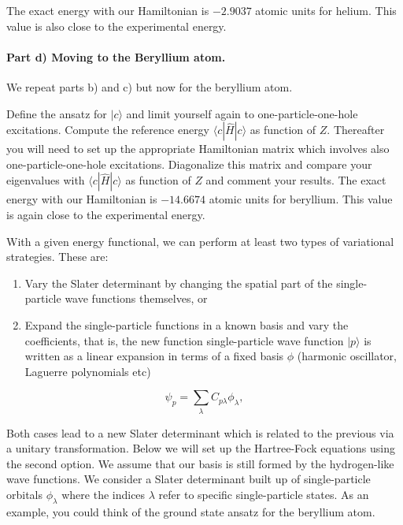 \documentclass[%
oneside,                 %
final,                   %
10pt]{article}
\begin{document}
The exact energy with our Hamiltonian is $-2.9037$ atomic units for
helium. This value is also close to the experimental energy.

\paragraph{Part d) Moving to the Beryllium atom.}
We repeat parts b) and c) but now for the beryllium atom.

Define the ansatz for $|c\rangle$ and limit yourself again to
one-particle-one-hole excitations.  Compute the reference energy
$\langle c | \hat{H}| c \rangle $ as function of $Z$. Thereafter you
will need to set up the appropriate Hamiltonian matrix which involves
also one-particle-one-hole excitations. Diagonalize this matrix and
compare your eigenvalues with $\langle c | \hat{H}| c \rangle$ as
function of $Z$ and comment your results.  The exact energy with our
Hamiltonian is $-14.6674$ atomic units for beryllium. This value is
again close to the experimental energy.

With a given energy
functional, we can perform at least two types of variational strategies. These are:

\begin{enumerate}
\item Vary the Slater determinant by changing the spatial part of the single-particle wave functions themselves, or

\item Expand the single-particle functions in a known basis  and vary the coefficients,  that is, the new function single-particle wave function $|p\rangle$ is written as a linear expansion in terms of a fixed basis $\phi$ (harmonic oscillator, Laguerre polynomials etc)  
\end{enumerate}

\noindent
\begin{equation*} 
\psi_p  = \sum_{\lambda} C_{p\lambda}\phi_{\lambda},
\end{equation*}

Both cases lead to a new Slater determinant which is related to the
previous via a unitary transformation.  Below we will set up the
Hartree-Fock equations using the second option.  We assume that our
basis is still formed by the hydrogen-like wave functions.  We
consider a Slater determinant built up of single-particle orbitals
$\phi_{\lambda}$ where the indices $\lambda$ refer to specific
single-particle states.  As an example, you could think of the ground
state ansatz for the beryllium atom.
\end{document}
